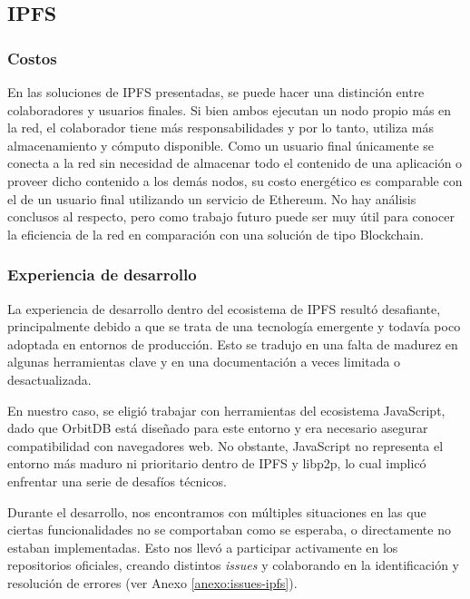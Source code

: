 \subsection{IPFS}



\subsubsection{Costos}

En las soluciones de IPFS presentadas, se puede hacer una distinción entre colaboradores y usuarios finales. Si bien ambos ejecutan un nodo propio más en la red, el colaborador tiene más responsabilidades y por lo tanto, utiliza más almacenamiento y cómputo disponible. Como un usuario final únicamente se conecta a la red sin necesidad de almacenar todo el contenido de una aplicación o proveer dicho contenido a los demás nodos, su costo energético es comparable con el de un usuario final utilizando un servicio de Ethereum.
No hay análisis conclusos al respecto, pero como trabajo futuro puede ser muy útil para conocer la eficiencia de la red en comparación con una solución de tipo Blockchain.

\subsubsection{Experiencia de desarrollo}

La experiencia de desarrollo dentro del ecosistema de IPFS resultó desafiante, principalmente debido a que se trata de una tecnología emergente y todavía poco adoptada en entornos de producción. Esto se tradujo en una falta de madurez en algunas herramientas clave y en una documentación a veces limitada o desactualizada.

En nuestro caso, se eligió trabajar con herramientas del ecosistema JavaScript, dado que OrbitDB está diseñado para este entorno y era necesario asegurar compatibilidad con navegadores web. No obstante, JavaScript no representa el entorno más maduro ni prioritario dentro de IPFS y libp2p, lo cual implicó enfrentar una serie de desafíos técnicos.

Durante el desarrollo, nos encontramos con múltiples situaciones en las que ciertas funcionalidades no se comportaban como se esperaba, o directamente no estaban implementadas. Esto nos llevó a participar activamente en los repositorios oficiales, creando distintos \textit{issues} y colaborando en la identificación y resolución de errores (ver Anexo \ref{anexo:issues-ipfs}).

